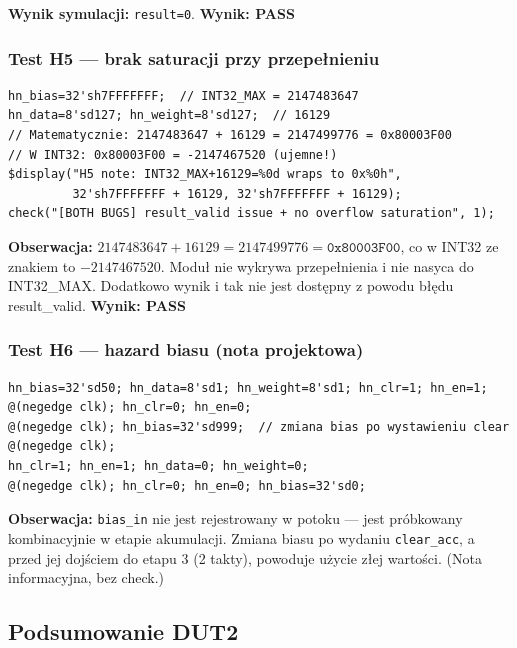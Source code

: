 \documentclass[12pt,a4paper]{article}
\begin{document}
\textbf{Wynik symulacji:} \texttt{result=0}. \textbf{Wynik: PASS}

\subsubsection*{Test H5 — brak saturacji przy przepełnieniu}

\begin{lstlisting}
hn_bias=32'sh7FFFFFFF;  // INT32_MAX = 2147483647
hn_data=8'sd127; hn_weight=8'sd127;  // 16129
// Matematycznie: 2147483647 + 16129 = 2147499776 = 0x80003F00
// W INT32: 0x80003F00 = -2147467520 (ujemne!)
$display("H5 note: INT32_MAX+16129=%0d wraps to 0x%0h",
         32'sh7FFFFFFF + 16129, 32'sh7FFFFFFF + 16129);
check("[BOTH BUGS] result_valid issue + no overflow saturation", 1);
\end{lstlisting}

\begin{infobox}
\textbf{Obserwacja:} $2147483647 + 16129 = 2147499776 = \texttt{0x80003F00}$, co w INT32 ze znakiem to $-2147467520$. Moduł nie wykrywa przepełnienia i nie nasyca do INT32\_MAX. Dodatkowo wynik i tak nie jest dostępny z powodu błędu result\_valid. \textbf{Wynik: PASS}
\end{infobox}

\subsubsection*{Test H6 — hazard biasu (nota projektowa)}

\begin{lstlisting}
hn_bias=32'sd50; hn_data=8'sd1; hn_weight=8'sd1; hn_clr=1; hn_en=1;
@(negedge clk); hn_clr=0; hn_en=0;
@(negedge clk); hn_bias=32'sd999;  // zmiana bias po wystawieniu clear
@(negedge clk);
hn_clr=1; hn_en=1; hn_data=0; hn_weight=0;
@(negedge clk); hn_clr=0; hn_en=0; hn_bias=32'sd0;
\end{lstlisting}

\textbf{Obserwacja:} \texttt{bias\_in} nie jest rejestrowany w potoku — jest próbkowany kombinacyjnie w etapie akumulacji. Zmiana biasu po wydaniu \texttt{clear\_acc}, a przed jej dojściem do etapu 3 (2 takty), powoduje użycie złej wartości. (Nota informacyjna, bez check.)

\subsection{Podsumowanie DUT2}
\end{document}
